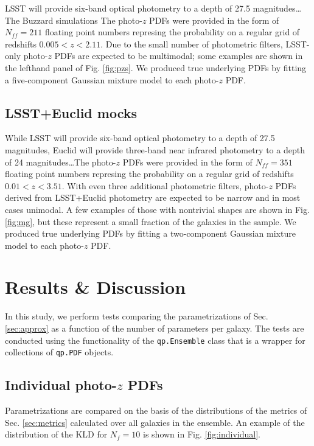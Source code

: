 \documentclass[\docopts]{\docclass}
\newcommand{\pz}{photo-$z$ PDF}
\begin{document}

LSST will provide six-band optical photometry to a depth of 27.5 
magnitudes\dots  The Buzzard simulations The \pz s were provided in the form of 
$N_{ff}=211$ floating point numbers represing the probability on a regular grid 
of redshifts $0.005 < z < 2.11$.  Due to the small number of photometric 
filters, LSST-only \pz s are expected to be multimodal; some examples are shown 
in the lefthand panel of Fig. \ref{fig:pzs}.  We produced true underlying PDFs 
by fitting a five-component Gaussian mixture model to each \pz.

\subsection{LSST+Euclid mocks}
\label{sec:mg}


While LSST will provide six-band optical photometry to a depth of 27.5 
magnitudes, Euclid will provide three-band near infrared photometry to a depth 
of 24 magnitudes\dots  The \pz s were provided in the form of $N_{ff}=351$ 
floating point numbers represing the probability on a regular grid of redshifts 
$0.01 < z < 3.51$.  With even three additional photometric filters, \pz s 
derived from LSST+Euclid photometry are expected to be narrow and in most cases 
unimodal.  A few examples of those with nontrivial shapes are shown in Fig. 
\ref{fig:mg}, but these represent a small fraction of the galaxies in the 
sample.  We produced true underlying PDFs by fitting a two-component Gaussian 
mixture model to each \pz.


\section{Results \& Discussion}
\label{sec:results}


In this study, we perform tests comparing the parametrizations of Sec. 
\ref{sec:approx} as a function of the number of parameters per galaxy.  The 
tests are conducted using the functionality of the \texttt{qp.Ensemble} class 
that is a wrapper for collections of \texttt{qp.PDF} objects.

\subsection{Individual \pz s}
\label{sec:individual}

Parametrizations are compared on the basis of the distributions of the metrics 
of Sec. \ref{sec:metrics} calculated over all galaxies in the ensemble.  An 
example of the distribution of the KLD for $N_{f}=10$ is shown in Fig. 
\ref{fig:individual}.
\end{document}
